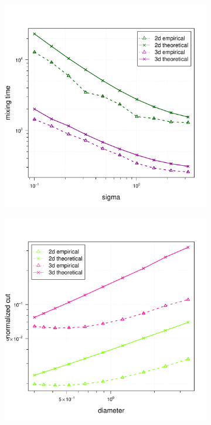 \documentclass{article}
\newcommand{\1}{\mathbf{1}}
\theoremstyle{aldenthm}
\theoremstyle{aldenrmrk}
\begin{document}
\begin{figure}
\begin{adjustbox}{minipage=\linewidth}
		
		\begin{subfigure}{.33\linewidth}
			\includegraphics[width=\linewidth]{example1plots/sigma_mixing_time_plot}
			\caption{}
		\end{subfigure}
		\begin{subfigure}{.33\linewidth}
			\includegraphics[width=\linewidth]{example1plots/diameter_normalized_cut_plot}

\end{subfigure}
\end{adjustbox}
\end{figure}
\end{document}
